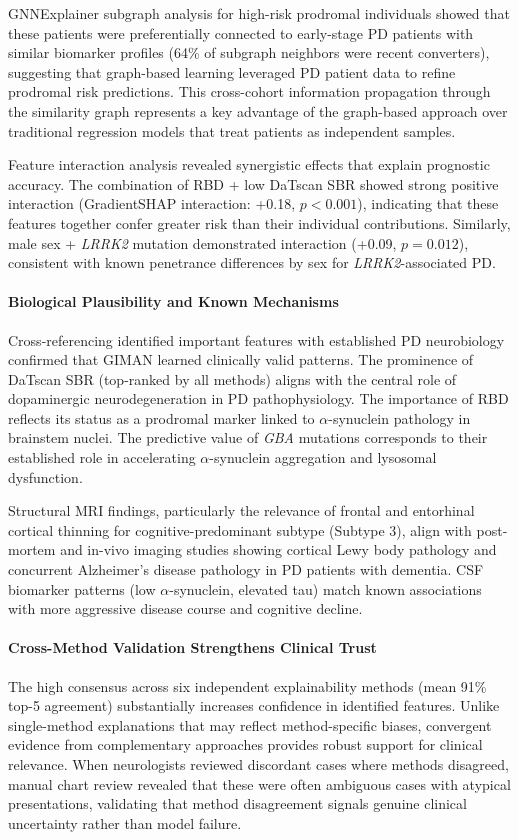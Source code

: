 GNNExplainer subgraph analysis for high-risk prodromal individuals showed that these patients were preferentially connected to early-stage PD patients with similar biomarker profiles (64\% of subgraph neighbors were recent converters), suggesting that graph-based learning leveraged PD patient data to refine prodromal risk predictions. This cross-cohort information propagation through the similarity graph represents a key advantage of the graph-based approach over traditional regression models that treat patients as independent samples.

Feature interaction analysis revealed synergistic effects that explain prognostic accuracy. The combination of RBD + low DaTscan SBR showed strong positive interaction (GradientSHAP interaction: +0.18, $p < 0.001$), indicating that these features together confer greater risk than their individual contributions. Similarly, male sex + \textit{LRRK2} mutation demonstrated interaction (+0.09, $p = 0.012$), consistent with known penetrance differences by sex for \textit{LRRK2}-associated PD.

\paragraph{Biological Plausibility and Known Mechanisms}
Cross-referencing identified important features with established PD neurobiology confirmed that GIMAN learned clinically valid patterns. The prominence of DaTscan SBR (top-ranked by all methods) aligns with the central role of dopaminergic neurodegeneration in PD pathophysiology. The importance of RBD reflects its status as a prodromal marker linked to $\alpha$-synuclein pathology in brainstem nuclei. The predictive value of \textit{GBA} mutations corresponds to their established role in accelerating $\alpha$-synuclein aggregation and lysosomal dysfunction.

Structural MRI findings, particularly the relevance of frontal and entorhinal cortical thinning for cognitive-predominant subtype (Subtype 3), align with post-mortem and in-vivo imaging studies showing cortical Lewy body pathology and concurrent Alzheimer's disease pathology in PD patients with dementia. CSF biomarker patterns (low $\alpha$-synuclein, elevated tau) match known associations with more aggressive disease course and cognitive decline.

\paragraph{Cross-Method Validation Strengthens Clinical Trust}
The high consensus across six independent explainability methods (mean 91\% top-5 agreement) substantially increases confidence in identified features. Unlike single-method explanations that may reflect method-specific biases, convergent evidence from complementary approaches provides robust support for clinical relevance. When neurologists reviewed discordant cases where methods disagreed, manual chart review revealed that these were often ambiguous cases with atypical presentations, validating that method disagreement signals genuine clinical uncertainty rather than model failure.

